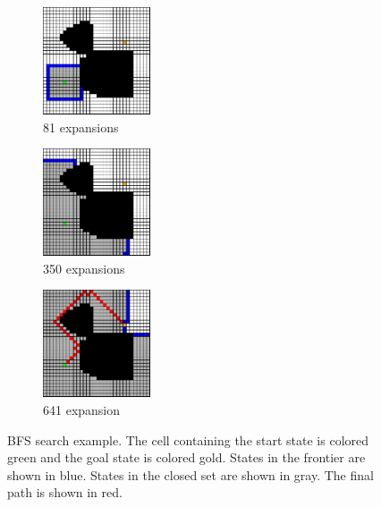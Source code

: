 \begin{figure}
\begin{center}
    \begin{subfigure}[t]{0.3\textwidth}
      \includegraphics[width=1.25in]{planning/figs/bfs_0081.pdf}
       \caption{81 expansions}
    \end{subfigure}
    \begin{subfigure}[t]{0.3\textwidth}
      \includegraphics[width=1.25in]{planning/figs/bfs_0350.pdf}
       \caption{350 expansions}
    \end{subfigure}
    \begin{subfigure}[t]{0.3\textwidth}
      \includegraphics[width=1.25in]{planning/figs/bfs_0641.pdf}
       \caption{641 expansion}
    \end{subfigure}

\end{center}
  \caption{BFS search example.  The cell containing the start state is
    colored green and the goal state is colored gold. States in the
    frontier are shown in blue.  States in the closed set are shown in
    gray.  The final path is shown in red. }
\label{fig:bfs}
\end{figure}




